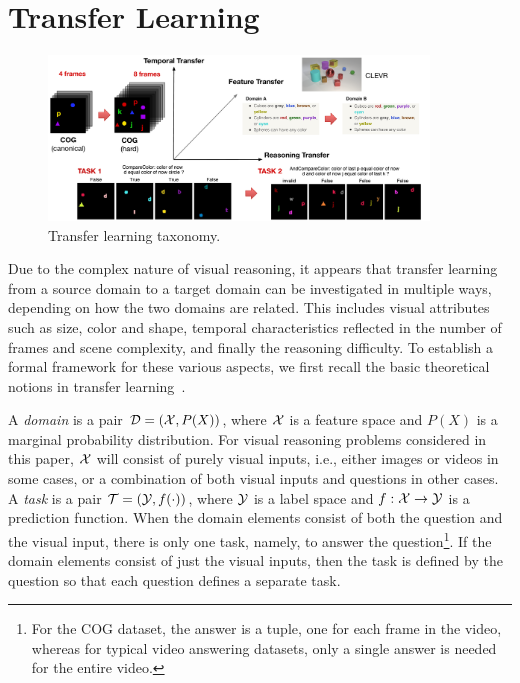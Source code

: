\section{Transfer Learning}
\label{sec:transfer_learning}

\begin{figure}[htbp]
	\centering
	\includegraphics[width=0.9\textwidth]{../img/architecture/transfer_taxo}
	\caption{Transfer learning taxonomy.}
	\label{fig:taskonomy}\vspace{-10pt}
\end{figure}

Due to the complex nature of visual reasoning, it appears that
transfer learning from a source domain to a target domain can be investigated in
multiple ways, depending on how the two domains are related. This includes visual attributes such as size, color and shape, temporal characteristics reflected in the number of frames and scene complexity, and finally the reasoning difficulty.
To establish a formal framework for these various aspects, we first recall the basic theoretical notions in transfer learning~\cite{pan2009survey}.

A \emph{domain} is a pair $\mathcal{D} = (\mathcal{X},P(X))$, where $\mathcal{X}$ is a feature space and $P(X)$ is a marginal probability distribution.
For visual reasoning problems considered in this paper,
$\mathcal{X}$ will consist of purely visual inputs, i.e., either images or videos in some cases, or
a combination of both visual inputs and questions in other cases.
A \emph{task} is a pair $\mathcal{T}= (\mathcal{Y},f(\cdot))$, where $\mathcal{Y}$ is a label space and $f: \mathcal{X} \to \mathcal{Y}$ is a prediction function.
When the domain elements consist of both the question and the visual input, there is only one task, namely, to answer the
question\footnote{%
	For the COG dataset, the answer is a tuple, one for each frame in the video, whereas for typical video answering datasets,
	only a single answer is needed for the entire video.}. %
If the domain elements consist of just the visual inputs, then the task is defined by the question so that each question
defines a separate task.

